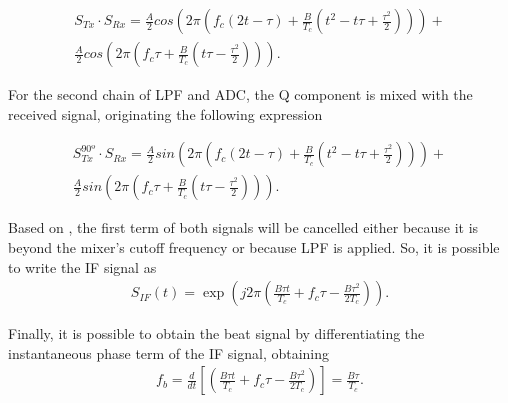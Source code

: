 \begin{equation}
    \begin{gathered}
    \label{eq:MixerInPhase}
    S_{Tx} \cdot  S_{Rx} = 
    \frac{A}{2} cos \left ( 2\pi \left (f_c (2t -\tau) + \frac{B}{T_c} \left(t^2 -t\tau + \frac{\tau^2}{2}\right)\right)\right) + \\
    \frac{A}{2} cos \left( 2\pi \left(f_c\tau + \frac{B}{T_c} \left(t\tau - \frac{\tau^2}{2} \right) \right )\right) .
    \end{gathered}
 \end{equation}

 For the second chain of \gls{LPF} and \gls{ADC}, the \gls{Q} component is mixed with the received signal, originating the following expression
 
\begin{equation}
    \begin{gathered}
    \label{eq:MixerQuadrature}
    S_{Tx}^{90º} \cdot  S_{Rx} = \frac{A}{2} sin \left ( 2\pi \left (f_c (2t -\tau) + \frac{B}{T_c} \left(t^2 -t\tau + \frac{\tau^2}{2}\right)\right)\right) + \\
    \frac{A}{2} sin \left( 2\pi \left(f_c\tau + \frac{B}{T_c} \left(t\tau - \frac{\tau^2}{2} \right) \right )\right).
   \end{gathered}
 \end{equation}

 Based on \cite{FMCWmixer_equations}, the first term of both signals will be cancelled either because it is beyond the mixer's cutoff frequency or because \gls{LPF} is applied. So, it is possible to write the \gls{IF} signal as 
 \begin{equation}
    \begin{gathered}
        \label{eq:S_IFrange}
        S_{IF}(t)  =  \exp \left(j2\pi \left( \frac{B\tau t}{T_c} + f_c \tau - \frac{B \tau^2}{2T_c} \right)\right).
   \end{gathered}
 \end{equation}

Finally, it is possible to obtain the beat signal by differentiating the instantaneous phase term of the \gls{IF} signal, obtaining
\begin{equation}
    \begin{gathered}
        \label{eq:beatsignal}
        f_b  =  \frac{d}{dt} \left[ \left( \frac{B\tau t}{T_c} + f_c \tau - \frac{B \tau^2}{2T_c} \right)
        \right] = 
        \frac{B\tau}{T_c}.
   \end{gathered}
 \end{equation}

